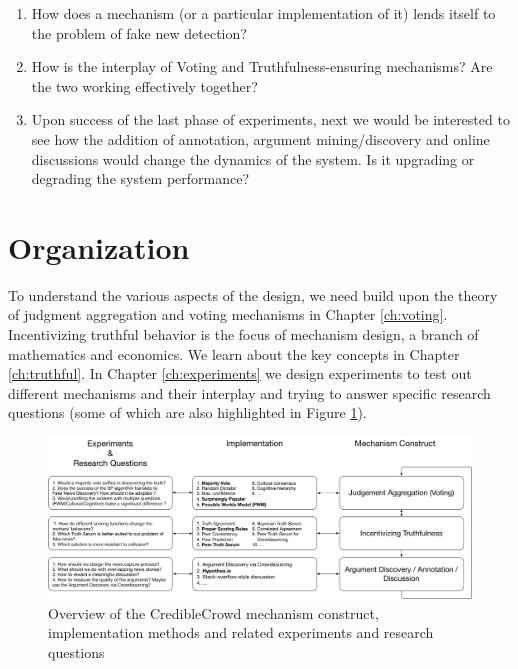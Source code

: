\documentclass{report}
\theoremstyle{definition}
\begin{document}
\begin{enumerate}
    \item How does a mechanism (or a particular implementation of it) lends itself to the problem of fake new detection?
    \item How is the interplay of Voting and Truthfulness-ensuring mechanisms? Are the two working effectively together?
    \item Upon success of the last phase of experiments, next we would be interested to see how the addition of annotation, argument mining/discovery and online discussions would change the dynamics of the system. Is it upgrading or degrading the system performance?
\end{enumerate}

\section{Organization}
 To understand the various aspects of the design, we need build upon the theory of judgment aggregation and voting mechanisms in Chapter \ref{ch:voting}. Incentivizing truthful behavior is the focus of mechanism design, a branch of mathematics and economics. We learn about the key concepts in Chapter \ref{ch:truthful}. In Chapter \ref{ch:experiments} we design experiments to test out different mechanisms and their interplay and trying to answer specific research questions (some of which are also highlighted in Figure \ref{fig:overview}).



\newpage
\thispagestyle{empty}
\begin{landscape}
\begin{figure}
\hspace*{-2.5cm}
\begin{minipage}{2\textwidth}
    \centering
    \includegraphics[width=\textwidth]{fake_news_diagram_2.pdf}
    \caption{Overview of the CredibleCrowd mechanism construct, implementation methods and related experiments and research questions}
    \label{fig:overview}
\end{minipage}
\end{figure}

\end{landscape}
\end{document}
